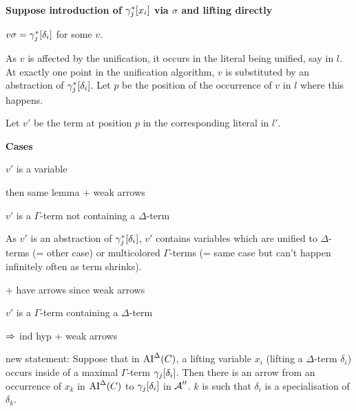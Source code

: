 \documentclass[,%
	paper=a4,%
	DIV14, %
	twoside=false,%
	liststotoc,
	bibtotoc,
	draft=false,%
	numbers=noendperiod
]{scrartcl}
\begin{document}
	~

	{\bfseries Suppose introduction of $\gamma_j^*[x_i]$ via $\sigma$ and lifting directly}

	$v\sigma = \gamma_j^*[\delta_i]$ for some $v$.

	As $v$ is affected by the unification, it occurs in the literal being unified, say in $l$.
	At exactly one point in the unification algorithm, $v$ is substituted by an abstraction of $\gamma_j^*[\delta_i]$.
	Let $p$ be the position of the occurrence of $v$ in $l$ where this happens.

	Let $v'$ be the term at position $p$ in the corresponding literal in $l'$.

	\textbf{Cases}
	\begin{compactitem}
	\item $v'$ is a variable 

		then same lemma + weak arrows

	\item $v'$ is a $\Gamma$-term not containing a $\Delta$-term 

		As $v'$ is an abstraction of $\gamma_j^*[\delta_i]$, $v'$ contains variables which are unified to $\Delta$-terms (= other case) or multicolored $\Gamma$-terms (= same case but can't happen infinitely often as term shrinks).

		+ have arrows since weak arrows

	\item $v'$ is a $\Gamma$-term containing a $\Delta$-term 

		$\Rightarrow$ ind hyp + weak arrows
	\end{compactitem}









	new statement:
	Suppose that in $\operatorname{AI}^\Delta(C)$, a lifting variable $x_i$ (lifting a $\Delta$-term $\delta_i$)
	occurs inside of a maximal $\Gamma$-term $\gamma_j[\delta_i]$.
	Then there is an arrow from an occurrence of $x_k$ in $\operatorname{AI}^\Delta(C)$ to $\gamma_j[\delta_i]$ in $\operatorname{\mathcal{A}}''$. $k$ is such that $\delta_i$ is a specialisation of $\delta_k$.
\end{document}
